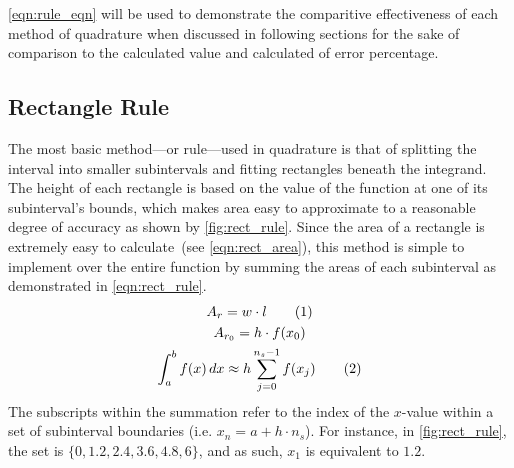 \documentclass{paper}
\begin{document}
\cref{eqn:rule_eqn} will be used to demonstrate the comparitive effectiveness of each method of quadrature when discussed in following sections for the sake of comparison to the calculated value and calculated of error percentage.
%
\subsection{Rectangle Rule}
\label{sec:rect_rule}
The most basic method---or rule---used in quadrature is that of splitting the interval into smaller subintervals and fitting rectangles beneath the integrand.
The height of each rectangle is based on the value of the function at one of its subinterval's bounds, which makes area easy to approximate to a reasonable degree of accuracy as shown by \cref{fig:rect_rule}.
Since the area of a rectangle is extremely easy to calculate~(see \cref{eqn:rect_area}), this method is simple to implement over the entire function by summing the areas of each subinterval as demonstrated in \cref{eqn:rect_rule}.\autocite{num_methods}
%
\begin{gather*}
    A_{r} = w \cdot l \tageq\label{eqn:rect_area}                                               \\
    A_{r_{0}} = h \cdot f(x_0)                                                                  \\
    \int_a^b f(x) \,dx \approx h \sum^{n_s-1}_{j=0}f(x_j) \tageq\label{eqn:rect_rule}
\end{gather*}
%
The subscripts within the summation refer to the index of the \(x\)-value within a set of subinterval boundaries (i.e. \(x_n = a + h \cdot n_s\)).
For instance, in \cref{fig:rect_rule}, the set is \(\{0, 1.2, 2.4, 3.6, 4.8, 6\}\), and as such, \(x_1\) is equivalent to \(1.2\).
\end{document}
